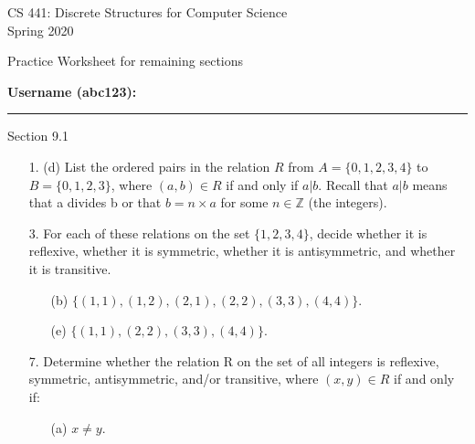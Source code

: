 \documentclass[12pt]{article}
\newcommand\bufprob{\vspace{2.0in}}
\begin{document}
\begin{center}
CS 441: Discrete Structures for Computer Science \\
{\smaller[1] Spring 2020} \\

\vspace {0.25in}

Practice Worksheet for remaining sections
\end{center}

\vspace{0.25in}

{\smaller[1]
\textbf{Username (abc123):} \rule{1.25in}{0.4pt}
}

\begin{center}
    {\large Section 9.1}
\end{center}

\begin{enumerate} %


\item[1. (d)] List the ordered pairs in the relation $R$ from $A = \{ 0,1,2,3,4 \}$ to $B = \{ 0, 1, 2, 3 \}$, where $(a,b) \in R$ if and only if $a | b$. Recall that $a | b$ means that a divides b or that $b = n \times a$ for some $n \in \mathbb{Z}$ (the integers).
\bufprob
%



\item[3.] For each of these relations on the set $\{ 1,2,3,4 \}$, decide whether it is reflexive, whether it is symmetric, whether it is antisymmetric, and whether it is transitive.

\begin{enumerate}
    \item[(b)] $\{ (1,1), (1,2), (2,1), (2,2), (3,3), (4,4) \}$.
    
    \item[(e)] $\{ (1,1), (2,2), (3,3), (4,4) \}$.
    
    
\end{enumerate}

\newpage



\item[7.] Determine whether the relation R on the set of all integers is reflexive, symmetric, antisymmetric, and/or transitive, where $(x,y) \in R$ if and only if:
%
\begin{enumerate}

\item[(a)] $x \neq y$.


\end{enumerate}
\end{enumerate}
\end{document}

